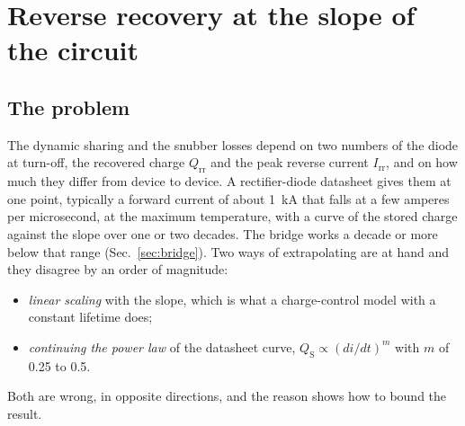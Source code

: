 \documentclass[10pt,a4paper]{scrartcl}
\newcommand{\Qrr}{Q_\mathrm{rr}}
\newcommand{\Irr}{I_\mathrm{rr}}
\begin{document}
\section{Reverse recovery at the slope of the circuit}
\label{sec:recovery}
\subsection{The problem}
The dynamic sharing and the snubber losses depend on two numbers of the diode at turn-off, the recovered charge $\Qrr$ and the peak reverse current $\Irr$, and on how much they differ from device to device. A rectifier-diode datasheet gives them at one point, typically a forward current of about \SI{1}{\kilo\ampere} that falls at a few amperes per microsecond, at the maximum temperature, with a curve of the stored charge against the slope over one or two decades. The bridge works a decade or more below that range (Sec.~\ref{sec:bridge}). Two ways of extrapolating are at hand and they disagree by an order of magnitude:
\begin{itemize}
\item \emph{linear scaling} with the slope, which is what a charge-control model with a constant lifetime does;
\item \emph{continuing the power law} of the datasheet curve, $Q_\mathrm{S} \propto (di/dt)^m$ with $m$ of 0.25 to 0.5.
\end{itemize}
Both are wrong, in opposite directions, and the reason shows how to bound the result.
\end{document}
